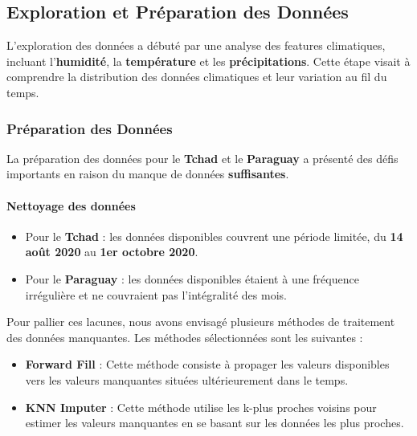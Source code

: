 \subsection{Exploration et Préparation des Données}
L'exploration des données a débuté par une analyse des features climatiques, incluant l'\textbf{humidité}, la \textbf{température} et les \textbf{précipitations}. Cette étape visait à comprendre la distribution des données climatiques et leur variation au fil du temps.
\subsubsection{Préparation des Données}
La préparation des données pour le \textbf{Tchad} et le \textbf{Paraguay} a présenté des défis importants en raison du manque de données \textbf{suffisantes}.

\paragraph*{Nettoyage des données}
\begin{itemize}
	\item Pour le \textbf{Tchad} : les données disponibles couvrent une période limitée, du \textbf{14 août 2020} au \textbf{1er octobre 2020}.
	\item Pour le \textbf{Paraguay} : les données disponibles étaient à une fréquence irrégulière et ne couvraient pas l'intégralité des mois.
\end{itemize}

Pour pallier ces lacunes, nous avons envisagé plusieurs méthodes de traitement des données manquantes. Les méthodes sélectionnées sont les suivantes :

\begin{itemize}
	\item \textbf{Forward Fill} : Cette méthode consiste à propager les valeurs disponibles vers les valeurs manquantes situées ultérieurement dans le temps.
	\item \textbf{KNN Imputer} : Cette méthode utilise les k-plus proches voisins pour estimer les valeurs manquantes en se basant sur les données les plus proches.
\end{itemize}

